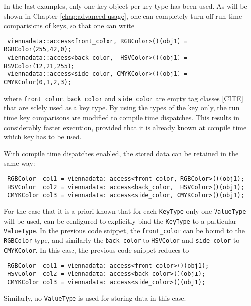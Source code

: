 In the last examples, only one key object per key type has been used. As will be shown in 
Chapter \ref{chap:advanced-usage}, one can completely turn off run-time comparisions of keys,
so that one can write
\begin{lstlisting}
 viennadata::access<front_color, RGBColor>()(obj1) = RGBColor(255,42,0);
 viennadata::access<back_color,  HSVColor>()(obj1) = HSVColor(12,21,255);
 viennadata::access<side_color, CMYKColor>()(obj1) = CMYKColor(0,1,2,3);
\end{lstlisting}
where \lstinline|front_color|, \lstinline|back_color| and \lstinline|side_color| are empty tag classes [CITE] that are solely used as a key type.
By using the types of the key only, the run time key comparisons are modified to compile time dispatches. This results in considerably faster
execution, provided that it is already known at compile time which key has to be used.


With compile time dispatches enabled, the stored data can be retained in the same way:
\begin{lstlisting}
 RGBColor  col1 = viennadata::access<front_color, RGBColor>()(obj1);
 HSVColor  col2 = viennadata::access<back_color,  HSVColor>()(obj1);
 CMYKColor col3 = viennadata::access<side_color, CMYKColor>()(obj1);
\end{lstlisting}
For the case that it is a-priori known that for each \lstinline|KeyType| only one \lstinline|ValueType| will be used, {\ViennaData}
can be configured to explicitly bind the \lstinline|KeyType| to a particular \lstinline|ValueType|. In the previous code snippet,
the \lstinline|front_color| can be bound to the \lstinline|RGBColor| type, and similarly the \lstinline|back_color| to \lstinline|HSVColor|
and \lstinline|side_color| to \lstinline|CMYKColor|. In this case, the previous code snippet reduces to
\begin{lstlisting}
 RGBColor  col1 = viennadata::access<front_color>()(obj1);
 HSVColor  col2 = viennadata::access<back_color>()(obj1);
 CMYKColor col3 = viennadata::access<side_color>()(obj1);
\end{lstlisting}
Similarly, no \lstinline|ValueType| is used for storing data in this case.



